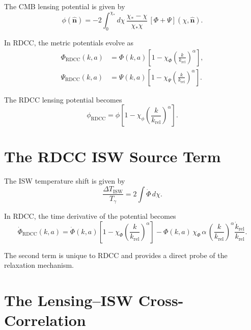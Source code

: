 \documentclass[11pt,a4paper]{article}
\begin{document}
The CMB lensing potential is given by
\begin{equation}
    \phi(\hat{\mathbf{n}})
    = -2 \int_{0}^{\chi_{*}}
      d\chi\,
      \frac{\chi_{*} - \chi}{\chi_{*}\chi}\,
      \left[\Phi + \Psi\right](\chi,\hat{\mathbf{n}}).
\end{equation}

In RDCC, the metric potentials evolve as
\begin{align}
    \Phi_{\mathrm{RDCC}}(k,a)
    &= \Phi(k,a)
       \left[
         1 - \chi_{\Phi}
         \left(\frac{k}{k_{\mathrm{rel}}}\right)^{\alpha}
       \right], \\
    \Psi_{\mathrm{RDCC}}(k,a)
    &= \Psi(k,a)
       \left[
         1 - \chi_{\Psi}
         \left(\frac{k}{k_{\mathrm{rel}}}\right)^{\alpha}
       \right].
\end{align}

The RDCC lensing potential becomes
\begin{equation}
    \phi_{\mathrm{RDCC}}
    = \phi
      \left[
        1 - \chi_{\phi}
        \left(\frac{k}{k_{\mathrm{rel}}}\right)^{\alpha}
      \right].
\end{equation}
\section{The RDCC ISW Source Term}

The ISW temperature shift is given by
\begin{equation}
    \frac{\Delta T_{\mathrm{ISW}}}{T_{\gamma}}
    = 2 \int \dot{\Phi}\, d\chi.
\end{equation}

In RDCC, the time derivative of the potential becomes
\begin{equation}
    \dot{\Phi}_{\mathrm{RDCC}}(k,a)
    = \dot{\Phi}(k,a)
      \left[
        1 - \chi_{\Phi}
        \left(\frac{k}{k_{\mathrm{rel}}}\right)^{\alpha}
      \right]
      - \Phi(k,a)\,
        \chi_{\Phi}\,\alpha\,
        \left(\frac{k}{k_{\mathrm{rel}}}\right)^{\alpha}
        \frac{\dot{k}_{\mathrm{rel}}}{k_{\mathrm{rel}}}.
\end{equation}

The second term is unique to RDCC and provides a direct probe of the relaxation 
mechanism.
\section{The Lensing--ISW Cross-Correlation}
\end{document}
